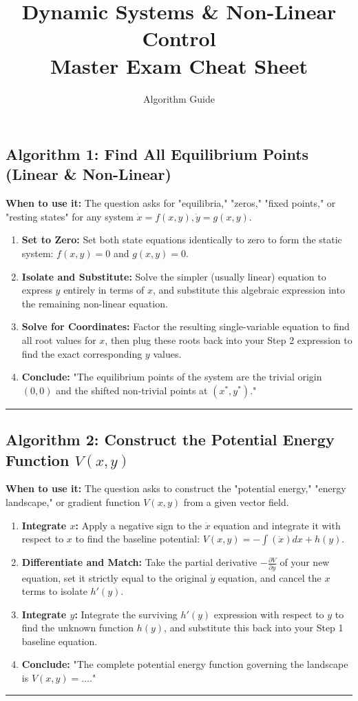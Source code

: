 \documentclass[11pt, a4paper]{report}
\title{\textbf{Dynamic Systems \& Non-Linear Control}\\ \Large Master Exam Cheat Sheet}
\author{Algorithm Guide}
\date{}
\begin{document}
\maketitle
\subsection*{Algorithm 1: Find All Equilibrium Points (Linear \& Non-Linear)}
\textbf{When to use it:} The question asks for "equilibria," "zeros," "fixed points," or "resting states" for any system $\dot{x}=f(x,y), \dot{y}=g(x,y)$.
\begin{enumerate}[label=\textbf{\arabic*.}]
    \item \textbf{Set to Zero:} Set both state equations identically to zero to form the static system: $f(x,y)=0$ and $g(x,y)=0$.
    \item \textbf{Isolate and Substitute:} Solve the simpler (usually linear) equation to express $y$ entirely in terms of $x$, and substitute this algebraic expression into the remaining non-linear equation.
    \item \textbf{Solve for Coordinates:} Factor the resulting single-variable equation to find all root values for $x$, then plug these roots back into your Step 2 expression to find the exact corresponding $y$ values.
    \item \textbf{Conclude:} "The equilibrium points of the system are the trivial origin $(0,0)$ and the shifted non-trivial points at $(x^*, y^*)$."
\end{enumerate}
\vspace{1em}
\noindent\rule{\textwidth}{0.4pt}
\vspace{1em}

\subsection*{Algorithm 2: Construct the Potential Energy Function $V(x,y)$}
\textbf{When to use it:} The question asks to construct the "potential energy," "energy landscape," or gradient function $V(x,y)$ from a given vector field.
\begin{enumerate}[label=\textbf{\arabic*.}]
    \item \textbf{Integrate $x$:} Apply a negative sign to the $\dot{x}$ equation and integrate it with respect to $x$ to find the baseline potential: $V(x,y) = -\int (\dot{x}) dx + h(y)$.
    \item \textbf{Differentiate and Match:} Take the partial derivative $-\frac{\partial V}{\partial y}$ of your new equation, set it strictly equal to the original $\dot{y}$ equation, and cancel the $x$ terms to isolate $h'(y)$.
    \item \textbf{Integrate $y$:} Integrate the surviving $h'(y)$ expression with respect to $y$ to find the unknown function $h(y)$, and substitute this back into your Step 1 baseline equation.
    \item \textbf{Conclude:} "The complete potential energy function governing the landscape is $V(x,y) = \dots$."
\end{enumerate}
\vspace{1em}
\noindent\rule{\textwidth}{0.4pt}
\vspace{1em}
\end{document}
